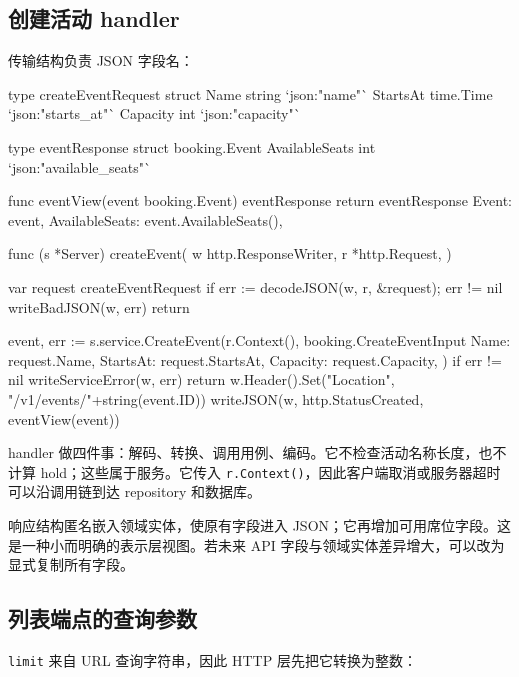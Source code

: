 \subsection{创建活动 handler}

传输结构负责 JSON 字段名：

\begin{gocode}[title={代码清单 12.29 \texttt{events.go}：创建活动 handler}]
type createEventRequest struct {
    Name     string    `json:"name"`
    StartsAt time.Time `json:"starts_at"`
    Capacity int       `json:"capacity"`
}

type eventResponse struct {
    booking.Event
    AvailableSeats int `json:"available_seats"`
}

func eventView(event booking.Event) eventResponse {
    return eventResponse{
        Event: event,
        AvailableSeats: event.AvailableSeats(),
    }
}

func (s *Server) createEvent(
    w http.ResponseWriter,
    r *http.Request,
) {
    var request createEventRequest
    if err := decodeJSON(w, r, &request); err != nil {
        writeBadJSON(w, err)
        return
    }

    event, err := s.service.CreateEvent(r.Context(),
        booking.CreateEventInput{
            Name: request.Name,
            StartsAt: request.StartsAt,
            Capacity: request.Capacity,
        })
    if err != nil {
        writeServiceError(w, err)
        return
    }
    w.Header().Set("Location", "/v1/events/"+string(event.ID))
    writeJSON(w, http.StatusCreated, eventView(event))
}
\end{gocode}

handler 做四件事：解码、转换、调用用例、编码。它不检查活动名称长度，也不计算 hold；这些属于服务。它传入 \texttt{r.Context()}，因此客户端取消或服务器超时可以沿调用链到达 repository 和数据库。

响应结构匿名嵌入领域实体，使原有字段进入 JSON；它再增加可用席位字段。这是一种小而明确的表示层视图。若未来 API 字段与领域实体差异增大，可以改为显式复制所有字段。

\subsection{列表端点的查询参数}

\texttt{limit} 来自 URL 查询字符串，因此 HTTP 层先把它转换为整数：

